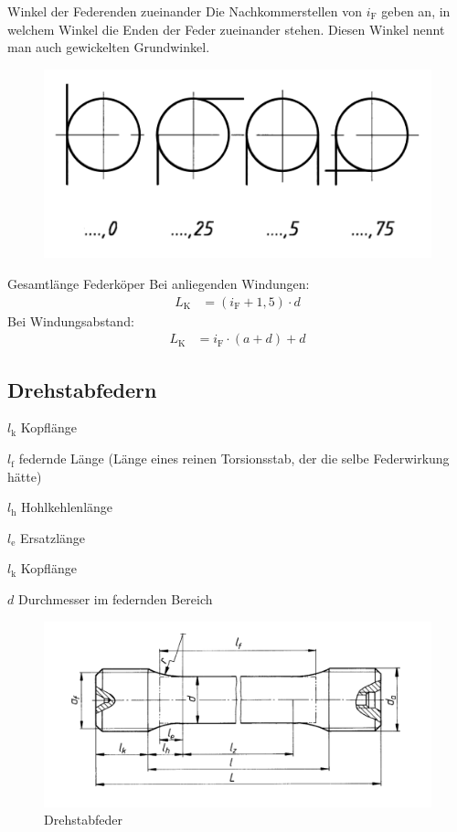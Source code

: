 \begin{eeqn}{Winkel der Federenden zueinander}
		Die Nachkommerstellen von $i_\text{F}$ geben an, in welchem Winkel die Enden der Feder zueinander stehen. Diesen Winkel nennt man auch gewickelten Grundwinkel.
		\begin{figure}[H]
			\centering
			\includegraphics[width=0.75\linewidth]{federn/drehfedern-winkel}
		\end{figure}
\end{eeqn}

\begin{eeqn}{Gesamtlänge Federköper}
	Bei anliegenden Windungen:
	\begin{align}
		L_\text{K} &= (i_\text{F}+1,5)\cdot d
	\end{align}
	Bei Windungsabstand:
	\begin{align}
		L_\text{K} &= i_\text{F} \cdot (a+d) +d
	\end{align}
\end{eeqn}

\pagebreak
\subsection{Drehstabfedern}
\begin{vardef}
	\item[$l_\text{k}$] Kopflänge
	\item[$l_\text{f}$] federnde Länge (Länge eines reinen Torsionsstab, der die selbe Federwirkung hätte)
	\item[$l_\text{h}$] Hohlkehlenlänge
	\item[$l_\text{e}$] Ersatzlänge 	
	\item[$l_\text{k}$] Kopflänge
	\item[$d$] Durchmesser im federnden Bereich
\end{vardef}
\begin{figure}[H]
	\centering
	\includegraphics[width=0.8\linewidth]{federn/drehstabfeder}
	\caption*{Drehstabfeder}
\end{figure}

